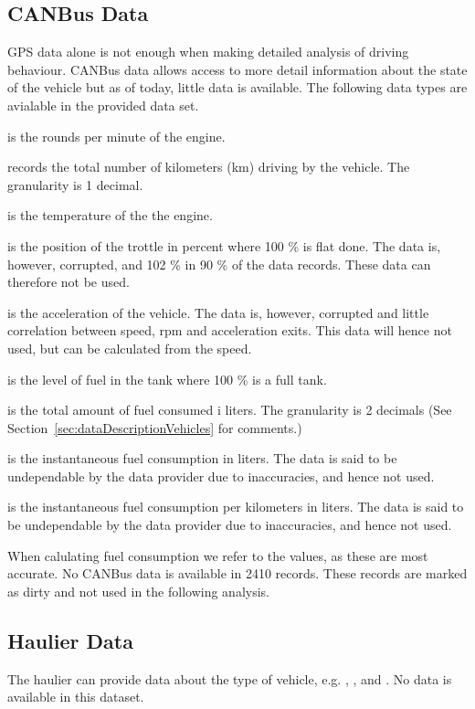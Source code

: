 \subsection{CANBus Data}
GPS data alone is not enough when making detailed analysis of driving behaviour.
CANBus data allows access to more detail information about the state of the vehicle but as of today, little data is available. 
The following data types are avialable in the provided data set.
\vspace{-5mm}
\begin{description*}
\item{} is the rounds per minute of the engine.
\item{} records the total number of kilometers (km) driving by the vehicle. The granularity is 1 decimal.
\item{} is the temperature of the the engine.
\item{} is the position of the trottle in percent where 100 \% is flat done. The data is, however, corrupted, and 102 \% in 90 \% of the data records. These data can therefore not be used.%
\item{} is the acceleration of the vehicle. The data is, however, corrupted and little correlation between speed, rpm and acceleration exits. This data will hence not used, but can be calculated from the speed.
\item{} is the level of fuel in the tank where 100 \% is a full tank.
\item{} is the total amount of fuel consumed i liters. The granularity is 2 decimals (See Section~\ref{sec:dataDescriptionVehicles} for comments.) 
\item{} is the instantaneous fuel consumption in liters. The data is said to be undependable by the data provider due to inaccuracies, and hence not used.
\item{} is the instantaneous fuel consumption per kilometers in liters. The data is said to be undependable by the data provider due to inaccuracies, and hence not used.
\end{description*}

When calulating fuel consumption we refer to the  values, as these are most accurate.
No CANBus data is available in 2410 records. These records are marked as dirty and not used in the following analysis.

\subsection{Haulier Data}
The haulier can provide data about the type of vehicle, e.g. , ,  and .
No data is available in this dataset.    

